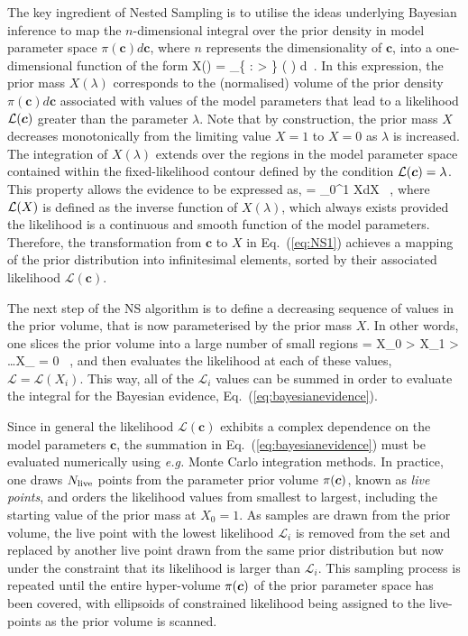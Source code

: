 The key ingredient of Nested Sampling is to utilise the ideas underlying 
Bayesian inference to map the $n$-dimensional integral over the prior density 
in model parameter space $\pi(\boldsymbol{c} )d\boldsymbol{c}$,
where $n$ represents the dimensionality of $\boldsymbol{c}$, into a one-dimensional function
of the form
\be
\label{eq:NS1}
X(\lambda) = \int_{\{  : \lp{} \rp > \lambda \}}
\pi( ) d \,. 
\ee
In this expression, the prior mass $X(\lambda)$ corresponds to the
(normalised) volume
of the prior density $\pi(\boldsymbol{c} )d\boldsymbol{c}$ associated with values
of the model parameters that lead to a likelihood $\mathcal{L}\lp\boldsymbol{c}\rp $ greater
than the parameter $\lambda$.
%
Note that by construction, the prior mass $X$ decreases monotonically
from the limiting value $X=1$ to $X=0$ as $\lambda$ is increased.
%
The integration of $X(\lambda)$ extends over the regions in the model parameter space contained
within the fixed-likelihood contour defined by the condition $\mathcal{L}\lp \boldsymbol{c} \rp=\lambda$.
%
This property allows the evidence to be expressed as,
\be
\label{eq:bayesianevidence}
 = \int_0^1  \lp X\rp dX \, ,
\ee
where $  \mathcal{L}\lp X\rp$ is defined as the inverse function of $X(\lambda)$, which
always exists provided the likelihood is a continuous and smooth function
of the model parameters.
%
Therefore, the transformation from $\boldsymbol{c}$
to $X$ in Eq.~(\ref{eq:NS1}) achieves a mapping of the prior distribution into infinitesimal
elements, sorted by their associated likelihood $\mathcal{L}(\boldsymbol{c})$.

The next step of the NS algorithm is to define a decreasing sequence of values in the prior
volume, that is now parameterised by the prior mass $X$.
%
In other words, one slices the prior volume into a large number of
small regions
 = X_0 > X_1 > \ldots X_{\infty} = 0 \, ,
\ee
and then evaluates the likelihood at each of these values, $\mathcal{L}=\mathcal{L}(X_i)$.
%
This way, all of the $\mathcal{L}_i$ values
can be summed in order to  evaluate the integral 
for the Bayesian evidence, Eq.~(\ref{eq:bayesianevidence}).

Since in general the likelihood $\mathcal{L}({\boldsymbol c})$ exhibits a complex dependence
on the model parameters $\boldsymbol{c}$, the summation
in Eq.~(\ref{eq:bayesianevidence}) must be evaluated
numerically using {\it e.g.} Monte Carlo integration methods.
%
In practice, one draws $N_{\rm live}$ points from the parameter prior
volume $\pi\lp\boldsymbol{c} \rp$, known as {\it live points}, and orders
the likelihood values from smallest to largest, including the 
starting value of the prior mass at $X_0=1$.
%
As samples are drawn from the prior volume, 
the live point with the lowest likelihood $\mathcal{L}_i$
is removed from the set and replaced by another live point drawn from the same prior
distribution but now under the constraint that its likelihood is larger than
$\mathcal{L}_i$.
%
This sampling process is repeated until the entire hyper-volume
$\pi \lp \boldsymbol{c} \rp$ of the prior parameter space has been covered, with
ellipsoids of constrained likelihood being assigned
to the live-points as the prior volume is scanned.

